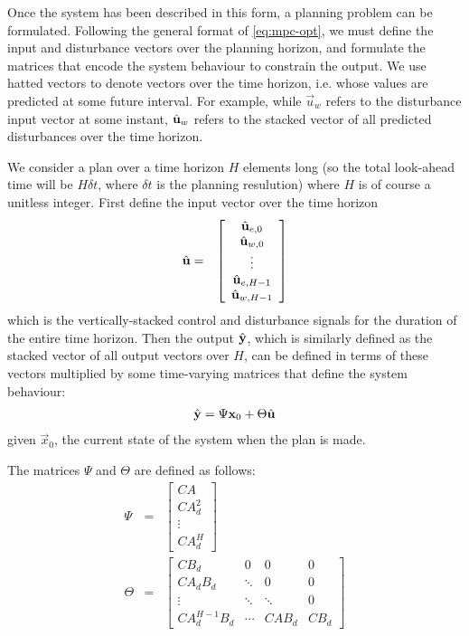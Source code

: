Once the system has been described in this form, a planning problem can be formulated.
Following the general format of \autoref{eq:mpc-opt}, we must define the input and disturbance vectors over the planning horizon, and formulate the matrices that encode the system behaviour to constrain the output.
We use hatted vectors to denote vectors over the time horizon, i.e. whose values are predicted at some future interval.
For example, while $\vec{u}_w$ refers to the disturbance input vector at some instant, $\hat{\mathbf{u}}_w$ refers to the stacked vector of all predicted disturbances over the time horizon.

We consider a plan over a time horizon $H$ elements long (so the total look-ahead time will be $H \delta t$, where $\delta t$ is the planning resulution) where $H$ is of course a unitless integer.
First define the input vector over the time horizon
\begin{eqnarray*}
   \hat{\mathbf{u}} &=& \left[\begin{array}{c}
      \hat{\mathbf{u}}_{e, 0} \\ \hat{\mathbf{u}}_{w, 0} \\
      \vdots \\
      \hat{\mathbf{u}}_{e, H-1} \\ \hat{\mathbf{u}}_{w, H-1}
   \end{array}\right]
\end{eqnarray*}
which is the vertically-stacked control and disturbance signals for the duration of the entire time horizon.
Then the output $\hat{\mathbf{y}}$, which is similarly defined as the stacked vector of all output vectors over $H$, can be defined in terms of these vectors multiplied by some time-varying matrices that define the system behaviour:
\begin{eqnarray}
   \label{eq:mpc-vectors}
	\hat{\mathbf{y}} = \Psi \mathbf{x}_0 + \Theta \hat{\mathbf{u}}
\end{eqnarray}
given $\vec{x}_0$, the current state of the system when the plan is made.

The matrices $\Psi$ and $\Theta$ are defined as follows:
\begin{eqnarray}
   \label{eq:mpc-psi}
   \Psi &=& \left[\begin{array}{c}
      CA \\ CA_d^2 \\ \vdots \\ CA_d^H
   \end{array}\right]
   \\
	\label{eq:mpc-theta}
   \Theta &=& \left[\begin{array}{cccc}
		C B_d & 0 & 0 & 0 \\
		C A_d B_d & \ddots & 0 & 0 \\
      \vdots & \ddots & \ddots & 0 \\
		C A_d ^{H-1} B_d & \cdots & C A B_d & C B_d
   \end{array}\right]
\end{eqnarray}

